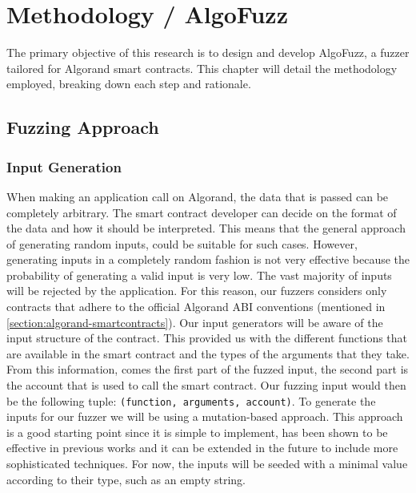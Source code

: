 
\chapter{Methodology / AlgoFuzz}\label{chapter:methodology}
The primary objective of this research is to design and develop AlgoFuzz, a fuzzer tailored for Algorand smart contracts.
This chapter will detail the methodology employed, breaking down each step and rationale.

\section{Fuzzing Approach}

\subsection*{Input Generation}
When making an application call on Algorand, the data that is passed can be completely arbitrary.
The smart contract developer can decide on the format of the data and how it should be interpreted.
This means that the general approach of generating random inputs, could be suitable for such cases.
However, generating inputs in a completely random fashion is not very effective because the probability of generating a valid input is very low.
The vast majority of inputs will be rejected by the application.
For this reason, our fuzzers considers only contracts that adhere to the official Algorand \ac{ABI} conventions (mentioned in \ref{section:algorand-smartcontracts}).
Our input generators will be aware of the input structure of the contract.
This provided us with the different functions that are available in the smart contract and the types of the arguments that they take.
From this information, comes the first part of the fuzzed input, the second part is the account that is used to call the smart contract.
Our fuzzing input would then be the following tuple: \texttt{(function, arguments, account)}.
To generate the inputs for our fuzzer we will be using a mutation-based approach.
This approach is a good starting point since it is simple to implement, has been shown to be effective in previous works \cite{zeller_greybox_2023} and it can be extended in the future to include more sophisticated techniques.
For now, the inputs will be seeded with a minimal value according to their type, such as an empty string.

